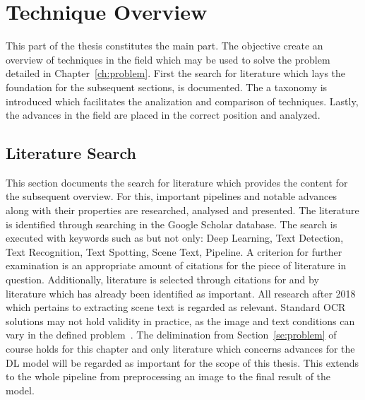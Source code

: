 \chapter{Technique Overview}\label{ch:research}
This part of the thesis constitutes the main part.
The objective create an overview of techniques in the field which may be used to solve the problem
detailed in Chapter~\ref{ch:problem}.
First the search for literature which lays the foundation for the subsequent sections, is documented.
The a taxonomy is introduced which facilitates the analization and comparison of techniques.
Lastly, the advances in the field are placed in the correct position and analyzed.

\section{Literature Search}\label{se:litSearch}
This section documents the search for literature which provides the content for the subsequent
overview.
For this, important pipelines and notable advances along with their properties are researched,
analysed and presented.
The literature is identified through searching in the Google Scholar database.
The search is executed with keywords such as but not only: Deep Learning, Text Detection,
Text Recognition, Text Spotting, Scene Text, Pipeline.
A criterion for further examination is an appropriate amount of citations for the piece of literature
in question.
Additionally, literature is selected through citations for and by literature which has already been
identified as important.
All research after 2018 which pertains to extracting scene text is regarded as relevant.
Standard \ac{OCR} solutions may not hold validity in practice, as the image and text conditions can
vary in the defined problem~\citep{chen_text_2021}.
The delimination from Section~\ref{se:problem} of course holds for this chapter and only literature
which concerns advances for the \ac{DL} model will be regarded as important for the scope of this
thesis.
This extends to the whole pipeline from preprocessing an image to the final result of the model.

